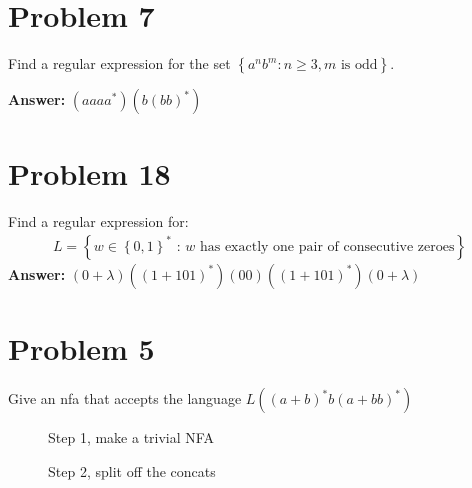 \documentclass{report}
\begin{document}
    \section*{Problem 7}
    Find a regular expression for the set $\left\{a^nb^m : n \geq 3, m \text{ is odd}\right\}$.

    \textbf{Answer:} $(aaaa^*)(b(bb)^*)$
\\
    \section*{Problem 18}
    Find a regular expression for:
    \begin{gather*}
        L = \left\{ w \in \left\{ 0, 1\right\}^* \text{ : } w \text{ has exactly one pair of consecutive zeroes} \right\}
    \end{gather*}
    \textbf{Answer: } $\left(0 + \lambda\right)\left(\left(1 + 101\right)^*\right) \left(00\right) \left(\left(1 + 101\right)^*\right) \left(0 + \lambda\right)$

    \section*{Problem 5}
    Give an nfa that accepts the language 
    $L\left( \left(a+b\right)^* b \left(a+bb\right)^* \right)$

    \begin{figure}[ht] %
        \centering %
        \caption*{Step 1, make a trivial NFA}
        \label{fig:p5s1}
    \end{figure}

    \begin{figure}[ht] %
        \centering %
        \caption*{Step 2, split off the concats}
        \label{fig:p5s2}
    \end{figure}
\end{document}

